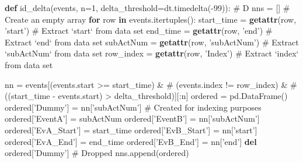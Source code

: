 \documentclass[11pt,]{article}
\newenvironment{Shaded}{\begin{snugshade}}{\end{snugshade}}
\newcommand{\BuiltInTok}[1]{\textcolor[rgb]{0.39,0.29,0.61}{\textbf{#1}}}
\newcommand{\CommentTok}[1]{\textcolor[rgb]{0.54,0.53,0.53}{#1}}
\newcommand{\ControlFlowTok}[1]{\textcolor[rgb]{0.12,0.11,0.11}{\textbf{#1}}}
\newcommand{\DecValTok}[1]{\textcolor[rgb]{0.69,0.50,0.00}{#1}}
\newcommand{\KeywordTok}[1]{\textcolor[rgb]{0.12,0.11,0.11}{\textbf{#1}}}
\newcommand{\NormalTok}[1]{\textcolor[rgb]{0.12,0.11,0.11}{#1}}
\newcommand{\OperatorTok}[1]{\textcolor[rgb]{0.12,0.11,0.11}{#1}}
\newcommand{\StringTok}[1]{\textcolor[rgb]{0.75,0.01,0.01}{#1}}
\begin{document}
\begin{Shaded}
\begin{Highlighting}[]
\KeywordTok{def}\NormalTok{ id_delta(events, n}\OperatorTok{=}\DecValTok{1}\NormalTok{, delta_threshold}\OperatorTok{=}\NormalTok{dt.timedelta(}\OperatorTok{-}\DecValTok{99}\NormalTok{)): }\CommentTok{# D}
\NormalTok{    nns }\OperatorTok{=}\NormalTok{ [] }\CommentTok{# Create an empty array}
    \ControlFlowTok{for}\NormalTok{ row }\KeywordTok{in}\NormalTok{ events.itertuples():}
\NormalTok{        start_time }\OperatorTok{=} \BuiltInTok{getattr}\NormalTok{(row, }\StringTok{'start'}\NormalTok{) }\CommentTok{# Extract `start` from data set}
\NormalTok{        end_time }\OperatorTok{=} \BuiltInTok{getattr}\NormalTok{(row, }\StringTok{'end'}\NormalTok{) }\CommentTok{# Extract `end` from data set}
\NormalTok{        subActNum }\OperatorTok{=} \BuiltInTok{getattr}\NormalTok{(row, }\StringTok{'subActNum'}\NormalTok{) }\CommentTok{# Extract `subActNum` from data set}
\NormalTok{        row_index }\OperatorTok{=} \BuiltInTok{getattr}\NormalTok{(row, }\StringTok{'Index'}\NormalTok{) }\CommentTok{# Extract `index` from data set}
        
\NormalTok{        nn }\OperatorTok{=}\NormalTok{ events[(events.start }\OperatorTok{>=}\NormalTok{ start_time) }\OperatorTok{&} \CommentTok{# }
\NormalTok{                    (events.index }\OperatorTok{!=}\NormalTok{ row_index) }\OperatorTok{&} \CommentTok{# }
\NormalTok{                    ((start_time }\OperatorTok{-}\NormalTok{ events.start) }\OperatorTok{>}\NormalTok{ delta_threshold)][:n]}
\NormalTok{        ordered }\OperatorTok{=}\NormalTok{ pd.DataFrame()}
\NormalTok{        ordered[}\StringTok{'Dummy'}\NormalTok{] }\OperatorTok{=}\NormalTok{ nn[}\StringTok{'subActNum'}\NormalTok{] }\CommentTok{# Created for indexing purposes}
\NormalTok{        ordered[}\StringTok{'EventA'}\NormalTok{] }\OperatorTok{=}\NormalTok{ subActNum}
\NormalTok{        ordered[}\StringTok{'EventB'}\NormalTok{] }\OperatorTok{=}\NormalTok{ nn[}\StringTok{'subActNum'}\NormalTok{]}
\NormalTok{        ordered[}\StringTok{'EvA_Start'}\NormalTok{] }\OperatorTok{=}\NormalTok{ start_time}
\NormalTok{        ordered[}\StringTok{'EvB_Start'}\NormalTok{] }\OperatorTok{=}\NormalTok{ nn[}\StringTok{'start'}\NormalTok{]}
\NormalTok{        ordered[}\StringTok{'EvA_End'}\NormalTok{] }\OperatorTok{=}\NormalTok{ end_time}
\NormalTok{        ordered[}\StringTok{'EvB_End'}\NormalTok{] }\OperatorTok{=}\NormalTok{ nn[}\StringTok{'end'}\NormalTok{]}
        \KeywordTok{del}\NormalTok{ ordered[}\StringTok{'Dummy'}\NormalTok{] }\CommentTok{# Dropped}
\NormalTok{        nns.append(ordered)}
  

\end{Highlighting}
\end{Shaded}
\end{document}

